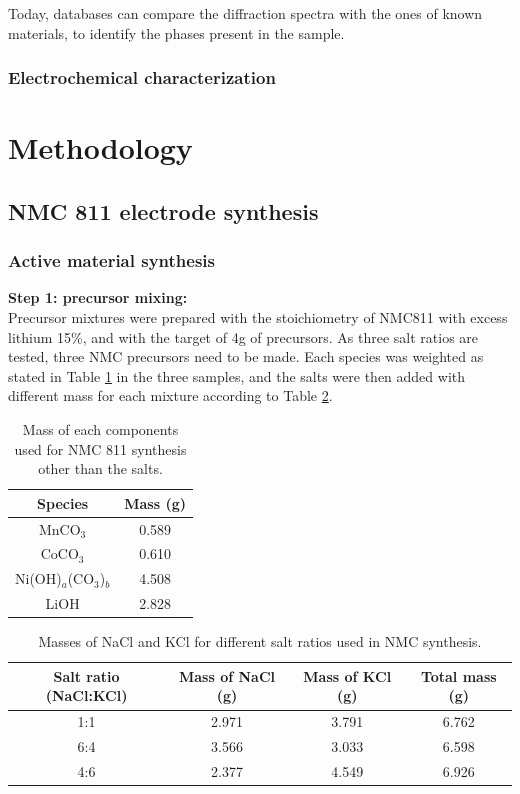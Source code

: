 \documentclass{article}
\begin{document}
Today, databases can compare the diffraction spectra with the ones of known materials, to identify the phases present in the sample.\\

\subsubsection{Electrochemical characterization}

\section {Methodology} 
\subsection{NMC 811 electrode synthesis}

\subsubsection{Active material synthesis}

\textbf{Step 1: precursor mixing: }\\
Precursor mixtures were prepared with the stoichiometry of NMC811
 with excess lithium 15\%, and with the target of 4g of precursors. As three salt ratios are tested, three NMC precursors need to be made. Each species was weighted as stated in Table \ref{t1} in the three samples, and the salts were then added with different mass for each mixture according to Table \ref{t2}.
\begin{table}[h!]
    \centering
    \begin{tabular}{|c|c|}
        \hline
        \textbf{Species} & \textbf{Mass (g)} \\ 
        \hline
        MnCO$_3$ & 0.589 \\
        CoCO$_3$ & 0.610 \\
        Ni(OH)$_a$(CO$_3$)$_b$ & 4.508 \\
        LiOH & 2.828 \\
        \hline
    \end{tabular}
    \caption{Mass of each components used for NMC 811 synthesis other than the salts.}
    \label{t1}
    
\end{table}
\begin{table}[h!]
  \centering
  \begin{tabular}{|c|c|c|c|}
    \hline
    \textbf{Salt ratio (NaCl:KCl)} & \textbf{Mass of NaCl (g)} & \textbf{Mass of KCl (g)} & \textbf{Total mass (g)} \\ 
    \hline
    1:1 & 2.971 & 3.791 & 6.762 \\ 
    6:4 & 3.566 & 3.033 & 6.598 \\ 
    4:6 & 2.377 & 4.549 & 6.926 \\ 
    \hline
  \end{tabular}
  \caption{Masses of NaCl and KCl for different salt ratios used in NMC synthesis.}
  \label{t2}
\end{table}
\end{document}
